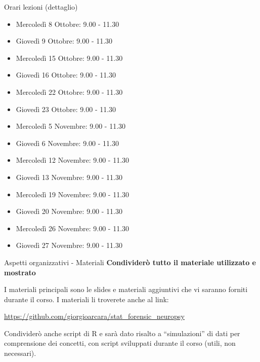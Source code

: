 \documentclass[
  ignorenonframetext,
]{beamer}
\providecommand{\tightlist}{%
  \setlength{\itemsep}{0pt}\setlength{\parskip}{0pt}}
\begin{document}
\begin{frame}{Orari lezioni (dettaglio)}
\label{orari-lezioni-dettaglio}
\scriptsize

\begin{itemize}
\tightlist
\item
  Mercoledì 8 Ottobre: 9.00 - 11.30
\item
  Giovedì 9 Ottobre: 9.00 - 11.30
\item
  Mercoledì 15 Ottobre: 9.00 - 11.30
\item
  Giovedì 16 Ottobre: 9.00 - 11.30
\item
  Mercoledì 22 Ottobre: 9.00 - 11.30
\item
  Giovedì 23 Ottobre: 9.00 - 11.30
\item
  Mercoledì 5 Novembre: 9.00 - 11.30
\item
  Giovedì 6 Novembre: 9.00 - 11.30
\item
  Mercoledì 12 Novembre: 9.00 - 11.30
\item
  Giovedì 13 Novembre: 9.00 - 11.30
\item
  Mercoledì 19 Novembre: 9.00 - 11.30
\item
  Giovedì 20 Novembre: 9.00 - 11.30
\item
  Mercoledì 26 Novembre: 9.00 - 11.30
\item
  Giovedì 27 Novembre: 9.00 - 11.30
\end{itemize}
\end{frame}

\begin{frame}{Aspetti organizzativi - Materiali}
\label{aspetti-organizzativi---materiali}
\textbf{Condividerò tutto il materiale utilizzato e mostrato}

I materiali principali sono le slides e materiali aggiuntivi che vi
saranno forniti durante il corso. I materiali li troverete anche al
link:

\href{\%5Bhttps://github.com/giorgioarcara/stat_forensic_neuropsy}{\ul{https://github.com/giorgioarcara/stat\_forensic\_neuropsy}}

Condividerò anche script di R e sarà dato risalto a ``simulazioni'' di
dati per comprensione dei concetti, con script sviluppati durante il
corso (utili, non necessari).
\end{frame}
\end{document}
